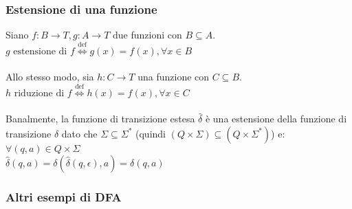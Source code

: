 \documentclass[]{article}
\begin{document}
\subsubsection{Estensione di una funzione}

Siano \mbox{$f \colon B \to T, g \colon A \to T$} due funzioni con \mbox{$ B \subseteq A $}.
\\
\mbox{$ g \text{ estensione di } f \overset{\text{def}}{\Leftrightarrow} g(x) = f(x), \forall x \in B $}
\\
\\
Allo stesso modo, sia \mbox{$h \colon C \to T$} una funzione con \mbox{$ C \subseteq B $}.
\\
\mbox{$ h \text{ riduzione di } f \overset{\text{def}}{\Leftrightarrow} h(x) = f(x), \forall x \in C $}
\\
\\
Banalmente, la funzione di transizione estesa \mbox{$ \hat\delta $} è una estensione della funzione di
transizione \mbox{$ \delta $} dato che \mbox{$ \Sigma \subseteq \Sigma^* $}
(quindi \mbox{$ (Q \times \Sigma) \subseteq (Q \times \Sigma^*) $}) e:
\\
\mbox{$ \forall (q, a) \in Q \times \Sigma $}
\\
\mbox{$ \hat\delta(q, a) = \delta(\hat\delta(q, \epsilon), a) = \delta(q, a) $}



\subsubsection{Altri esempi di DFA}
\end{document}
